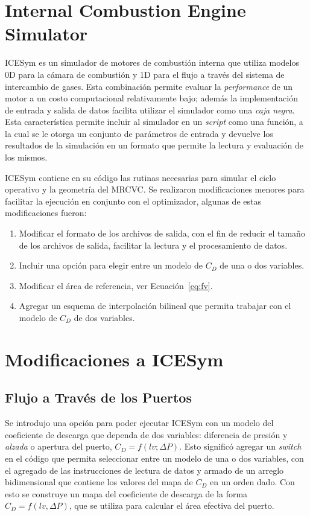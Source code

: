 \section{Internal Combustion Engine Simulator}
%
ICESym es un simulador de motores de combustión interna que  utiliza modelos 0D
para la cámara de combustión y 1D para el flujo a través del sistema de
intercambio de gases.
%
Esta combinación permite evaluar la \emph{performance} de un motor a un costo
computacional relativamente bajo; además la implementación de entrada y salida
de datos facilita utilizar el simulador como una \emph{caja negra}.
%
Esta característica permite incluir al simulador en un \emph{script} como una
función, a la cual se le otorga un conjunto de parámetros de entrada y devuelve
los resultados de la simulación en un formato que permite la lectura y
evaluación de los mismos.

ICESym contiene en su código las rutinas necesarias para simular el ciclo
operativo y la geometría del MRCVC.
%
Se realizaron modificaciones menores para facilitar la ejecución en conjunto con
el optimizador, algunas de estas modificaciones fueron:
%
\begin{enumerate}
    \item Modificar el formato de los archivos de salida, con el fin de reducir
el tamaño de los archivos de salida, facilitar la lectura y el procesamiento de
datos.
    \item Incluir una opción para elegir entre un modelo de $C_D$ de una o dos
variables.
    \item Modificar el área de referencia, ver Ecuación~\ref{eq:fv}.
    \item Agregar un esquema de interpolación bilineal que permita trabajar con
el modelo de $C_{D}$ de dos variables.
\end{enumerate}


\section{Modificaciones a ICESym}
\subsection{Flujo a Través de los Puertos}
%
Se introdujo una opción para poder ejecutar ICESym con un modelo del coeficiente
de descarga que dependa de dos variables: diferencia de presión y \emph{alzada}
o apertura del puerto, $C_D = f(lv; \Delta P)$.
%
Esto significó agregar un \emph{switch} en el código que permita seleccionar
entre un modelo de una o dos variables, con el agregado de las instrucciones de
lectura de datos y armado de un arreglo bidimensional que contiene los valores
del mapa de $C_{D}$ en un orden dado.
%
Con esto se construye un mapa del coeficiente de descarga de la forma $C_D =
f(lv, \Delta P)$, que se utiliza para calcular el área efectiva del puerto.

